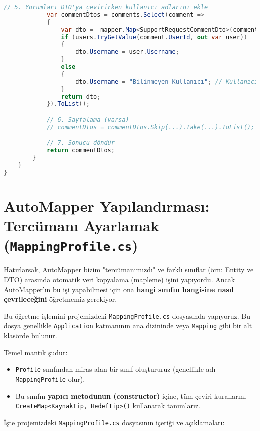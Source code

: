 \documentclass[11pt, a4paper]{article}
\begin{document}
\begin{lstlisting}[language=C#]
            // 5. Yorumları DTO'ya çevirirken kullanıcı adlarını ekle
            var commentDtos = comments.Select(comment =>
            {
                var dto = _mapper.Map<SupportRequestCommentDto>(comment);
                if (users.TryGetValue(comment.UserId, out var user))
                {
                    dto.Username = user.Username;
                }
                else
                {
                    dto.Username = "Bilinmeyen Kullanıcı"; // Kullanıcı silinmişse
                }
                return dto;
            }).ToList();

            // 6. Sayfalama (varsa)
            // commentDtos = commentDtos.Skip(...).Take(...).ToList();

            // 7. Sonucu döndür
            return commentDtos;
        }
    }
}
\end{lstlisting}

\newpage 

\section{AutoMapper Yapılandırması: Tercümanı Ayarlamak (\texttt{MappingProfile.cs})}

Hatırlarsak, AutoMapper bizim "tercümanımızdı" ve farklı sınıflar (örn: Entity ve DTO) arasında otomatik veri kopyalama (mapleme) işini yapıyordu. Ancak AutoMapper'ın bu işi yapabilmesi için ona \textbf{hangi sınıfın hangisine nasıl çevrileceğini} öğretmemiz gerekiyor.

Bu öğretme işlemini projemizdeki \texttt{MappingProfile.cs} dosyasında yapıyoruz. Bu dosya genellikle \texttt{Application} katmanının ana dizininde veya \texttt{Mapping} gibi bir alt klasörde bulunur.

Temel mantık şudur:
\begin{itemize}
    \item \texttt{Profile} sınıfından miras alan bir sınıf oluştururuz (genellikle adı \texttt{MappingProfile} olur).
    \item Bu sınıfın \textbf{yapıcı metodunun (constructor)} içine, tüm çeviri kurallarını \texttt{CreateMap<KaynakTip, HedefTip>()} kullanarak tanımlarız.
\end{itemize}

İşte projemizdeki \texttt{MappingProfile.cs} dosyasının içeriği ve açıklamaları:
\end{document}
